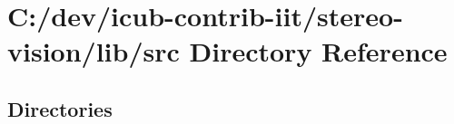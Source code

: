 \section{C\+:/dev/icub-\/contrib-\/iit/stereo-\/vision/lib/src Directory Reference}
\label{dir_a065c5f60305fee3569f887679366939}
\subsection*{Directories}
\begin{DoxyCompactItemize}
\end{DoxyCompactItemize}
